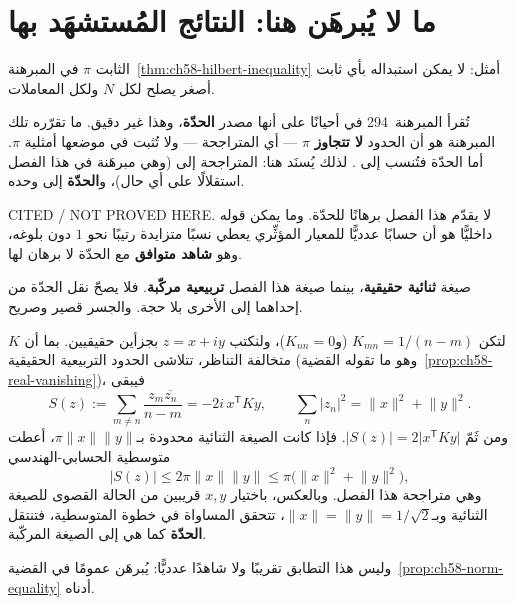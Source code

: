 \section{ما لا يُبرهَن هنا: النتائج المُستشهَد بها}

\begin{proposition}[حدّة الثابت \(\pi\)]
\label{prop:ch58-sharpness-cited}
الثابت \(\pi\) في المبرهنة~\ref{thm:ch58-hilbert-inequality} أمثل: لا
يمكن استبداله بأي ثابت أصغر يصلح لكل \(N\) ولكل المعاملات.
\end{proposition}

\begin{remark}
\label{rem:ch58-attribution-precision}
تُقرأ المبرهنة~294 في \cite{HardyLittlewoodPolya1952} أحيانًا على أنها
مصدر \textbf{الحدّة}، وهذا غير دقيق. ما تقرّره تلك المبرهنة هو أن الحدود
\textbf{لا تتجاوز} \(\pi\) — أي المتراجحة — ولا تُثبت في موضعها أمثلية
\(\pi\). أما الحدّة فتُنسب إلى \cite{Schur1911}. لذلك يُسنَد هنا:
المتراجحة إلى \cite[المبرهنة~294]{HardyLittlewoodPolya1952} (وهي مبرهَنة
في هذا الفصل استقلالًا على أي حال)، و\textbf{الحدّة} إلى
\cite{Schur1911} وحده.

\noindent\textenglish{CITED / NOT PROVED HERE}. لا يقدّم هذا الفصل
برهانًا للحدّة. وما يمكن قوله داخليًّا هو أن حسابًا عدديًّا للمعيار
المؤثِّري يعطي نسبًا متزايدة رتيبًا نحو \(1\) دون بلوغه، وهو
\textbf{شاهد متوافق} مع الحدّة لا برهان لها.
\end{remark}

\begin{remark}
\label{rem:ch58-bilinear-bridge}
صيغة \cite[المبرهنة~294]{HardyLittlewoodPolya1952} \textbf{ثنائية
حقيقية}، بينما صيغة هذا الفصل \textbf{تربيعية مركّبة}. فلا يصحّ نقل
الحدّة من إحداهما إلى الأخرى بلا حجة. والجسر قصير وصريح.

لتكن \(K_{mn}=1/(n-m)\) (و\(K_{nn}=0\))، ولنكتب \(z=x+iy\) بجزأين
حقيقيين. بما أن \(K\) متخالفة التناظر، تتلاشى الحدود التربيعية الحقيقية
(وهو ما تقوله القضية~\ref{prop:ch58-real-vanishing})، فيبقى
\[
S(z):=\sum_{m\ne n}\frac{z_m\overline{z_n}}{n-m}=-2i\,x^{\mathsf T}Ky,
\qquad
\sum_n\lvert z_n\rvert^2=\lVert x\rVert^2+\lVert y\rVert^2 .
\]
ومن ثَمّ \(\lvert S(z)\rvert=2\lvert x^{\mathsf T}Ky\rvert\). فإذا كانت
الصيغة الثنائية محدودة بـ\(\pi\lVert x\rVert\lVert y\rVert\)، أعطت
متوسطية الحسابي-الهندسي
\[
\lvert S(z)\rvert\le2\pi\lVert x\rVert\lVert y\rVert
\le\pi\bigl(\lVert x\rVert^2+\lVert y\rVert^2\bigr),
\]
وهي متراجحة هذا الفصل. وبالعكس، باختيار \(x,y\) قريبين من الحالة
القصوى للصيغة الثنائية وبـ\(\lVert x\rVert=\lVert y\rVert=1/\sqrt2\)،
تتحقق المساواة في خطوة المتوسطية، فتنتقل \textbf{الحدّة} كما هي إلى
الصيغة المركّبة.

وليس هذا التطابق تقريبًا ولا شاهدًا عدديًّا: يُبرهَن عمومًا في
القضية~\ref{prop:ch58-norm-equality} أدناه.
\end{remark}

